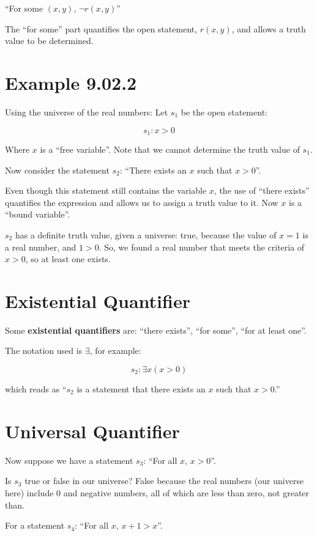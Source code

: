 \documentclass{article}
\begin{document}
``For some $(x,y)$, $\neg{}r(x,y)$''

The ``for some'' part quantifies the open statement, $r(x,y)$, and
allows a truth value to be determined.

\section*{Example 9.02.2}

Using the universe of the real numbers: Let $s_1$ be the open statement:

\[
s_1 : x>0
\]

Where $x$ is a ``free variable''. Note that we cannot determine the
truth value of $s_1$.

Now consider the statement $s_2$: ``There exists an $x$ such that
$x>0$''.

Even though this statement still contains the variable $x$, the use of
``there exists'' quantifies the expression and allows us to assign a
truth value to it. Now $x$ is a ``bound variable''.

$s_2$ has a definite truth value, given a universe: true, because the
value of $x=1$ is a real number, and $1>0$. So, we found a real number
that meets the criteria of $x>0$, so at least one exists.

\section*{Existential Quantifier}

Some \textbf{existential quantifiers} are: ``there exists'', ``for
some'', ``for at least one''.

The notation used is $\exists$, for example:

\[
s_2: \exists x (x>0)
\]

which reads as ``$s_2$ is a statement that there exists an $x$ such
that $x>0$.''

\section*{Universal Quantifier}

Now suppose we have a statement $s_3$: ``For all $x$, $x>0$''.

Is $s_3$ true or false in our universe? False because the real numbers
(our universe here) include $0$ and negative numbers, all of which are
less than zero, not greater than.

For a statement $s_4$: ``For all $x$, $x+1>x$''.
\end{document}

